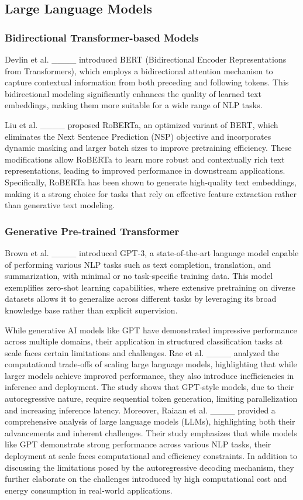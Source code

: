 \subsection{Large Language Models}
\subsubsection{Bidirectional Transformer-based Models}
Devlin et al. ____ introduced BERT (Bidirectional Encoder Representations from Transformers), which employs a bidirectional attention mechanism to capture contextual information from both preceding and following tokens. This bidirectional modeling significantly enhances the quality of learned text embeddings, making them more suitable for a wide range of NLP tasks. 

Liu et al. ____ proposed RoBERTa, an optimized variant of BERT, which eliminates the Next Sentence Prediction (NSP) objective and incorporates dynamic masking and larger batch sizes to improve pretraining efficiency. These modifications allow RoBERTa to learn more robust and contextually rich text representations, leading to improved performance in downstream applications. Specifically, RoBERTa has been shown to generate high-quality text embeddings, making it a strong choice for tasks that rely on effective feature extraction rather than generative text modeling.

\subsubsection{Generative Pre-trained Transformer}
Brown et al. ____ introduced GPT-3, a state-of-the-art language model capable of performing various NLP tasks such as text completion, translation, and summarization, with minimal or no task-specific training data. This model exemplifies zero-shot learning capabilities, where extensive pretraining on diverse datasets allows it to generalize across different tasks by leveraging its broad knowledge base rather than explicit supervision.


While generative AI models like GPT have demonstrated impressive performance across multiple domains, their application in structured classification tasks at scale faces certain limitations and challenges.
Rae et al. ____ analyzed the computational trade-offs of scaling large language models, highlighting that while larger models achieve improved performance, they also introduce inefficiencies in inference and deployment. The study shows that GPT-style models, due to their autoregressive nature, require sequential token generation, limiting parallelization and increasing inference latency.
Moreover, Raiaan et al. ____ provided a comprehensive analysis of large language models (LLMs), highlighting both their advancements and inherent challenges. Their study emphasizes that while models like GPT demonstrate strong performance across various NLP tasks, their deployment at scale faces computational and efficiency constraints. In addition to discussing the limitations posed by the autoregressive decoding mechanism, they further elaborate on the challenges introduced by high computational cost and energy consumption in real-world applications.


